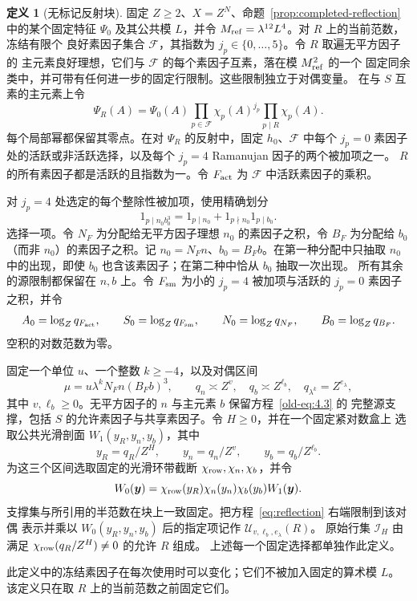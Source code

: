 \documentclass[11pt,a4paper]{article}
\numberwithin{equation}{section}
\numberwithin{figure}{section}
\theoremstyle{definition}
\newtheorem{definition}[theorem]{定义}
\theoremstyle{remark}
\begin{document}
\begin{definition}[无标记反射块]
\label{def:unmarked-reflected-block}
固定 $Z\ge2$、$X=Z^N$、命题~\ref{prop:completed-reflection} 中的某个固定特征 $\Psi_0$
及其公共模 $L$，并令 $M_{\rm ref}=\lambda^{12}L^4$。对 $R$ 上的当前范数，冻结有限个
良好素因子集合 $\mathcal F$，其指数为 $j_p\in\{0,\ldots,5\}$。令 $R$ 取遍无平方因子的
主元素良好理想，它们与 $\mathcal F$ 的每个素因子互素，落在模 $M_{\rm ref}^2$ 的一个
固定同余类中，并可带有任何进一步的固定行限制。这些限制独立于对偶变量。
在与 $S$ 互素的主元素上令
\[
 \Psi_R(A)=\Psi_0(A)\prod_{p\in\mathcal F}\chi_p(A)^{j_p}
                         \prod_{p\mid R}\chi_p(A).
\]
每个局部幂都保留其零点。在对 $\Psi_R$ 的反射中，固定 $h_0$、$\mathcal F$ 中每个
$j_p=0$ 素因子处的活跃或非活跃选择，以及每个 $j_p=4$ Ramanujan 因子的两个被加项之一。
$R$ 的所有素因子都是活跃的且指数为一。令 $F_{\rm act}$ 为 $\mathcal F$ 中活跃素因子的乘积。

对 $j_p=4$ 处选定的每个整除性被加项，使用精确划分
\[
 1_{p\mid n_0b_0^3}=1_{p\mid n_0}+1_{p\nmid n_0}1_{p\mid b_0}.
\]
选择一项。令 $N_F$ 为分配给无平方因子理想 $n_0$ 的素因子之积，令 $B_F$ 为分配给
$b_0$（而非 $n_0$）的素因子之积。记 $n_0=N_Fn$、$b_0=B_Fb$。在第一种分配中只抽取
$n_0$ 中的出现，即使 $b_0$ 也含该素因子；在第二种中恰从 $b_0$ 抽取一次出现。
所有其余的源限制都保留在 $n,b$ 上。令 $F_{\rm sm}$ 为小的 $j_p=4$ 被加项与活跃的
$j_p=0$ 素因子之积，并令
\[
 A_0=\log_Zq_{F_{\rm act}},\qquad S_0=\log_Zq_{F_{\rm sm}},\qquad
 N_0=\log_Zq_{N_F},\qquad B_0=\log_Zq_{B_F}.
\]
空积的对数范数为零。

固定一个单位 $u$、一个整数 $k\ge-4$，以及对偶区间
\[
 \mu=u\lambda^kN_Fn(B_Fb)^3,\qquad
 q_n\asymp Z^v,\quad q_b\asymp Z^{\ell_b},\quad
 q_{\lambda^k}=Z^{e_\lambda},
\]
其中 $v,\ell_b\ge0$。无平方因子的 $n$ 与主元素 $b$ 保留方程~\eqref{old-eq:4.3} 的
完整源支撑，包括 $S$ 的允许素因子与共享素因子。令 $H\ge0$，并在一个固定紧对数盒上
选取公共光滑剖面 $W_1(y_R,y_n,y_b)$，其中
\[
 y_R=q_R/Z^H,\qquad y_n=q_n/Z^v,\qquad y_b=q_b/Z^{\ell_b}.
\]
为这三个区间选取固定的光滑环带截断 $\chi_{\rm row},\chi_n,\chi_b$，并令
\[
 W_0(\boldsymbol y)=\chi_{\rm row}(y_R)\chi_n(y_n)\chi_b(y_b)W_1(\boldsymbol y).
\]
支撑集与所引用的半范数在块上一致固定。把方程~\eqref{eq:reflection} 右端限制到该对偶
表示并乘以 $W_0(y_R,y_n,y_b)$ 后的指定项记作 $\mathcal U_{v,\ell_b,e_\lambda}(R)$。
原始行集 $\mathcal I_H$ 由满足 $\chi_{\rm row}(q_R/Z^H)\ne0$ 的允许 $R$ 组成。
上述每一个固定选择都单独作此定义。
\end{definition}

此定义中的冻结素因子在每次使用时可以变化；它们不被加入固定的算术模 $L$。
该定义只在取 $R$ 上的当前范数之前固定它们。
\end{document}
